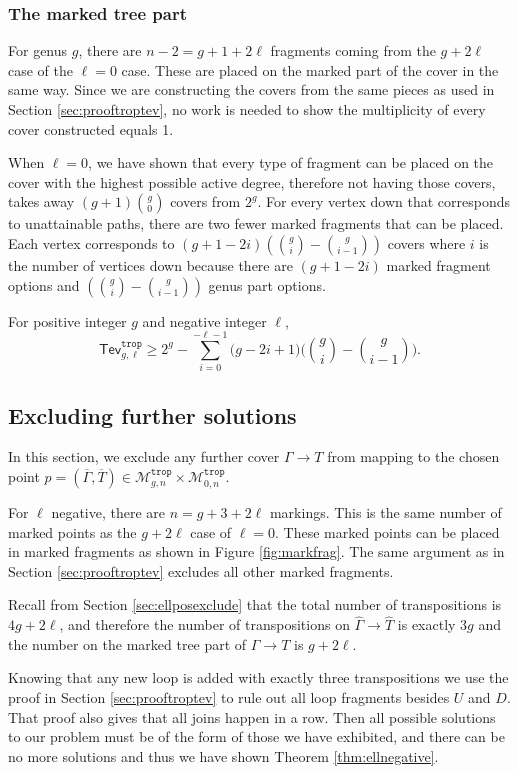 \documentclass[11pt,reqno]{amsart}
\theoremstyle{definition}
\newcommand\trop{{\mathtt{trop}}}
\newcommand\Mgn[1]{\mathcal M_{#1}}
\newcommand{\gGamma}{\widehat{\Gamma}}
\newcommand{\gT}{\widehat{T}}
\newcommand{\Tev}{{\mathsf{Tev}}}
\begin{document}
\subsubsection*{The marked tree part}
For genus $g$, there are $n-2=g+1+2\ell$ fragments coming from the $g+2\ell$ case of the $\ell=0$ case. These are placed on the marked part of the cover in the same way. Since we are constructing the covers from the same pieces as used in Section \ref{sec:prooftroptev}, no work is needed to show the multiplicity of every cover constructed equals 1. 

When $\ell=0$, we have shown that every type of fragment can be placed on the cover with the highest possible active degree, therefore not having those covers, takes away $(g+1) {g\choose{0}}$ covers from $2^g$. For every vertex down that corresponds to unattainable paths, there are two fewer marked fragments that can be placed. Each vertex corresponds to $(g+1-2i)({g\choose{i}}-{g\choose{i-1}})$ covers where $i$ is the number of vertices down because there are $(g+1-2i)$ marked fragment options and $({g\choose{i}}-{g\choose{i-1}})$ genus part options. 

For positive integer $g$ and negative integer $\ell$, \[\Tev^\trop_{g,\ell}\geq 2^g - \sum_{i=0}^{-\ell-1}\bigg(g-2i+1\bigg)\bigg({g\choose i}-{g \choose i-1}\bigg).\]

\subsection{Excluding further solutions}
In this section, we exclude any further cover $\Gamma \to T$ from mapping to  the chosen point $p= (\overline{\Gamma},\overline{T})\in \Mgn{g,n}^\trop\times \Mgn{0,n}^\trop$. 

For $\ell$ negative, there are $n=g+3+2\ell$ markings. This is the same number of marked points as the $g+2\ell$ case of $\ell=0$. These marked points can be placed in marked fragments as shown in Figure \ref{fig:markfrag}. The same argument as in Section \ref{sec:prooftroptev} excludes all other marked fragments.

Recall from Section \ref{sec:ellposexclude} that the total number of transpositions is $4g+2\ell$, and therefore the number of transpositions on $\gGamma \to \gT$ is exactly $3g$ and the number on the marked tree part of $\Gamma \to T$ is $g+2\ell$.

Knowing that any new loop is added with exactly three transpositions we use the proof in Section \ref{sec:prooftroptev} to rule out all loop fragments besides $U$ and $D$. That proof also gives that all joins happen in a row. Then all possible solutions to our problem must be of the form of those we have exhibited, and there can be no more solutions and thus we have shown Theorem \ref{thm:ellnegative}.
\end{document}
